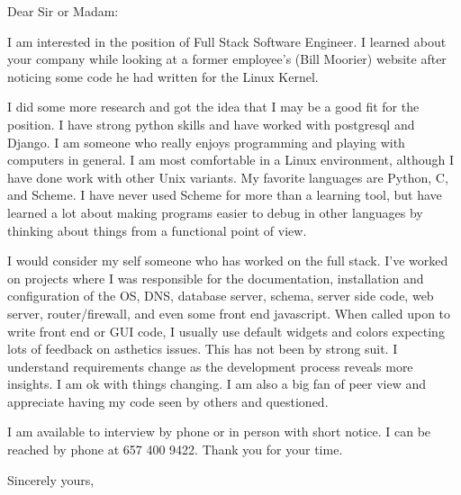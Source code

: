 \documentclass{letter}
\begin{document}
\begin{letter}{}
\opening{Dear Sir or Madam:}

I am interested in the position of Full Stack Software Engineer.  I
learned about your company while looking at a former
employee's (Bill Moorier) website after noticing some code he had
written for the Linux Kernel.

I did some more research and got the idea that I may be a good
fit for the position.  I have strong python skills and have worked with
postgresql and Django.
I am someone who really enjoys programming and playing with computers in
general.  I am most comfortable in a Linux environment, although I have
done work with other Unix variants.  My favorite languages are Python,
C, and Scheme.  I have never used Scheme for more than a learning tool,
but have learned a lot about making programs easier to debug in other
languages by thinking about things from a functional point of view.

I would consider my self someone who has worked on the full stack.
I've worked on projects where I was responsible for the documentation,
installation and
configuration of the OS, DNS, database server, schema, server side code,
web server, router/firewall, and even some front end javascript.
When called upon to write front end or GUI code, I usually use default widgets
and colors expecting lots of feedback on asthetics issues.  This has not
been by strong suit.
I understand requirements change as the development process reveals
more insights.  I am ok with things changing.  I am also a big fan of
peer view and appreciate having my code seen by others and questioned.

I am available to interview by phone or in person with short notice.  I
can be reached by phone at 657 400 9422.  Thank you for your time.

\closing{Sincerely yours,}
\end{letter}
\end{document}
